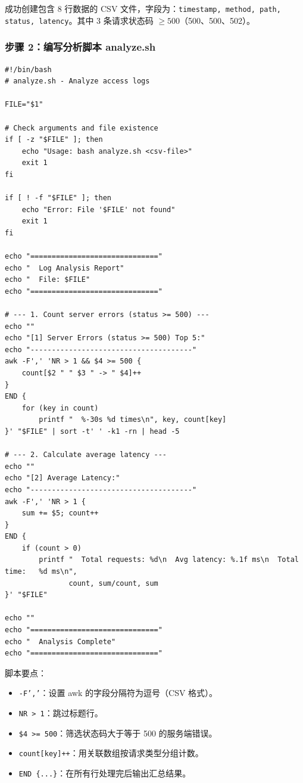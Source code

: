 \documentclass[12pt,a4paper]{article}
\begin{document}
\begin{resultbox}
成功创建包含 8 行数据的 CSV 文件，字段为：\texttt{timestamp, method, path, status, latency}。其中 3 条请求状态码 $\geq 500$（500、500、502）。
\end{resultbox}

\subsubsection{步骤 2：编写分析脚本 analyze.sh}

\begin{lstlisting}[style=shellstyle, caption={analyze.sh - Log analysis script}]
#!/bin/bash
# analyze.sh - Analyze access logs

FILE="$1"

# Check arguments and file existence
if [ -z "$FILE" ]; then
    echo "Usage: bash analyze.sh <csv-file>"
    exit 1
fi

if [ ! -f "$FILE" ]; then
    echo "Error: File '$FILE' not found"
    exit 1
fi

echo "=============================="
echo "  Log Analysis Report"
echo "  File: $FILE"
echo "=============================="

# --- 1. Count server errors (status >= 500) ---
echo ""
echo "[1] Server Errors (status >= 500) Top 5:"
echo "--------------------------------------"
awk -F',' 'NR > 1 && $4 >= 500 {
    count[$2 " " $3 " -> " $4]++
}
END {
    for (key in count)
        printf "  %-30s %d times\n", key, count[key]
}' "$FILE" | sort -t' ' -k1 -rn | head -5

# --- 2. Calculate average latency ---
echo ""
echo "[2] Average Latency:"
echo "--------------------------------------"
awk -F',' 'NR > 1 {
    sum += $5; count++
}
END {
    if (count > 0)
        printf "  Total requests: %d\n  Avg latency: %.1f ms\n  Total time:   %d ms\n",
               count, sum/count, sum
}' "$FILE"

echo ""
echo "=============================="
echo "  Analysis Complete"
echo "=============================="
\end{lstlisting}

\begin{notebox}
脚本要点：
\begin{itemize}[leftmargin=1em]
    \item \texttt{-F','}：设置 awk 的字段分隔符为逗号（CSV 格式）。
    \item \texttt{NR > 1}：跳过标题行。
    \item \texttt{\$4 >= 500}：筛选状态码大于等于 500 的服务端错误。
    \item \texttt{count[key]++}：用关联数组按请求类型分组计数。
    \item \texttt{END \{...\}}：在所有行处理完后输出汇总结果。
\end{itemize}
\end{notebox}
\end{document}
